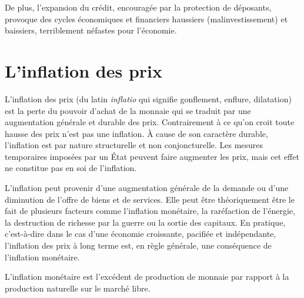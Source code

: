De plus, l'expansion du crédit, encouragée par la protection de déposants, provoque des cycles économiques et financiers haussiers (malinvestissement) et baissiers, terriblement néfastes pour l'économie.


\section*{L'inflation des prix}


L'inflation des prix (du latin \emph{inflatio} qui signifie gonflement, enflure, dilatation) est la perte du pouvoir d'achat de la monnaie qui se traduit par une augmentation générale et durable des prix. Contrairement à ce qu'on croit toute hausse des prix n'est pas une inflation. À cause de son caractère durable, l'inflation est par nature structurelle et non conjoncturelle. Les mesures temporaires imposées par un État peuvent faire augmenter les prix, mais cet effet ne constitue pas en soi de l'inflation.

L'inflation peut provenir d'une augmentation générale de la demande ou d'une diminution de l'offre de biens et de services. Elle peut être théoriquement être le fait de plusieurs facteurs comme l'inflation monétaire, la raréfaction de l'énergie, la destruction de richesse par la guerre ou la sortie des capitaux. En pratique, c'est-à-dire dans le cas d'une économie croissante, pacifiée et indépendante, l'inflation des prix à long terme est, en règle générale, une conséquence de l'inflation monétaire. %


L'inflation monétaire est l'excédent de production de monnaie par rapport à la production naturelle sur le marché libre.

